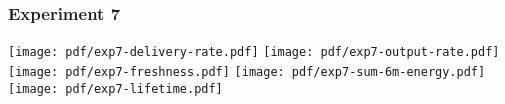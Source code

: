 \documentclass{article}
\begin{document}


\subsubsection{Experiment 7}
\texttt{[image: pdf/exp7-delivery-rate.pdf]}
\texttt{[image: pdf/exp7-output-rate.pdf]}
\texttt{[image: pdf/exp7-freshness.pdf]}
\texttt{[image: pdf/exp7-sum-6m-energy.pdf]}
\texttt{[image: pdf/exp7-lifetime.pdf]}
\end{document}
